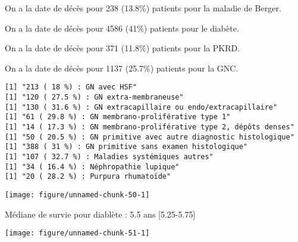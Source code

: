 \documentclass[11pt,a4paper]{article}\usepackage[]{graphicx}\usepackage[]{color}
\makeatletter
\def\maxwidth{ %
  \ifdim\Gin@nat@width>\linewidth
    \linewidth
  \else
    \Gin@nat@width
  \fi
}
\newenvironment{kframe}{%
 \def\at@end@of@kframe{}%
 \ifinner\ifhmode%
  \def\at@end@of@kframe{\end{minipage}}%
  \begin{minipage}{\columnwidth}%
 \fi\fi%
 \def\FrameCommand##1{\hskip\@totalleftmargin \hskip-\fboxsep
 \colorbox{shadecolor}{##1}\hskip-\fboxsep
     \hskip-\linewidth \hskip-\@totalleftmargin \hskip\columnwidth}%
 \MakeFramed {\advance\hsize-\width
   \@totalleftmargin\z@ \linewidth\hsize
   \@setminipage}}%
 {\par\unskip\endMakeFramed%
 \at@end@of@kframe}
\newenvironment{knitrout}{}{} %
\makeatother
\begin{document}
  On a la date de décès pour 238 (13.8\%) patients pour la maladie de Berger.
  
  On a la date de décès pour 4586 (41\%) patients pour le diabète.
  
  On a la date de décès pour 371 (11.8\%) patients pour la PKRD.
  
  On a la date de décès pour 1137 (25.7\%) patients pour la GNC.

\begin{knitrout}
\color{fgcolor}\begin{kframe}
\begin{verbatim}
[1] "213 ( 18 %) : GN avec HSF"
[1] "120 ( 27.5 %) : GN extra-membraneuse"
[1] "130 ( 31.6 %) : GN extracapillaire ou endo/extracapillaire"
[1] "61 ( 29.8 %) : GN membrano-proliférative type 1"
[1] "14 ( 17.3 %) : GN membrano-proliférative type 2, dépôts denses"
[1] "50 ( 20.5 %) : GN primitive avec autre diagnostic histologique"
[1] "388 ( 31 %) : GN primitive sans examen histologique"
[1] "107 ( 32.7 %) : Maladies systémiques autres"
[1] "34 ( 16.4 %) : Néphropathie lupique"
[1] "20 ( 28.2 %) : Purpura rhumatoïde"
\end{verbatim}
\end{kframe}
\end{knitrout}


\begin{knitrout}
\color{fgcolor}
\texttt{[image: figure/unnamed-chunk-50-1]} 

\end{knitrout}

Médiane de survie pour diablète : 5.5 ans [5.25-5.75]

\begin{knitrout}
\color{fgcolor}
\texttt{[image: figure/unnamed-chunk-51-1]} 

\end{knitrout}
\end{document}
